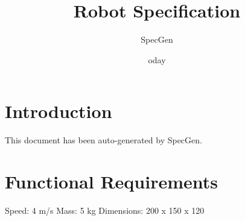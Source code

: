 \documentclass{article}
\title{Robot Specification}
\author{SpecGen}
\date{	oday}
\begin{document}
\maketitle
\section{Introduction}
This document has been auto-generated by SpecGen.
\section{Functional Requirements}
Speed: 4 m/s
Mass: 5 kg
Dimensions: 200 x 150 x 120
\end{document}
